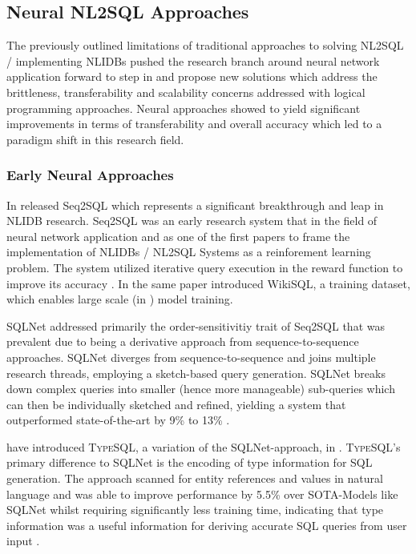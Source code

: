 \subsection{Neural NL2SQL Approaches}

The previously outlined limitations of traditional approaches to solving NL2SQL / implementing NLIDBs pushed the research
branch around neural network application forward to step in and propose new solutions which address the brittleness, 
transferability and scalability concerns addressed with logical programming approaches. Neural approaches showed to yield
significant improvements in terms of transferability and overall accuracy which led to a paradigm shift in this research
field.

\subsubsection{Early Neural Approaches}

In \citeyear{Seq2SQL} \citeauthor*{Seq2SQL} released Seq2SQL which represents a significant breakthrough and leap in NLIDB 
research. Seq2SQL was an early research system that in the field of neural network application and as one of the first papers
to frame the implementation of NLIDBs / NL2SQL Systems as a reinforement learning problem. The system utilized iterative query 
execution in the reward function to improve its accuracy \citep{Seq2SQL}. In the same paper \citeauthor*{Seq2SQL} introduced 
WikiSQL, a training dataset, which enables large scale (in \citeyear{Seq2SQL}) model training.

SQLNet \citep{SQLNet} addressed primarily the order-sensitivitiy trait of Seq2SQL \citep{Seq2SQL} that was prevalent due to being
a derivative approach from sequence-to-sequence approaches. SQLNet diverges from sequence-to-sequence and joins multiple research 
threads, employing a sketch-based query generation. SQLNet breaks down complex queries into smaller (hence more manageable)
sub-queries which can then be individually sketched and refined, yielding a system that outperformed state-of-the-art by 9\% 
to 13\% \citep{SQLNet}.

\citeauthor*{TypeSQL} have introduced \textsc{TypeSQL}, a variation of the SQLNet-approach, in \citeyear{TypeSQL}.
\textsc{TypeSQL}'s primary difference to SQLNet is the encoding of type information for SQL generation. The approach scanned
for entity references and values in natural language and was able to improve performance by 5.5\% over SOTA-Models like
SQLNet whilst requiring significantly less training time, indicating that type information was a useful information for deriving 
accurate SQL queries from user input \citep{TypeSQL}.

